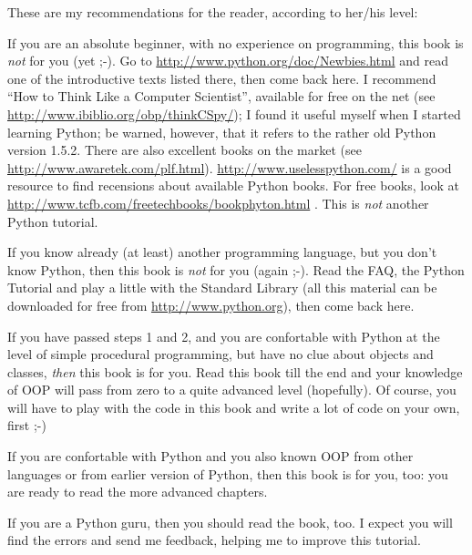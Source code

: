 \documentclass[10pt,english]{article}
\begin{document}
These are my recommendations for the reader, according to her/his level:
\begin{list}{.}
{
\setlength{\rightmargin}{\leftmargin}
}
\item {} 
If you are an absolute beginner, with no experience on programming,
this book is \emph{not} for you (yet ;-). Go to 
\href{http://www.python.org/doc/Newbies.html}{http://www.python.org/doc/Newbies.html} and read one of the introductive 
texts listed there, then come back here. I recommend ``How to Think Like 
a Computer Scientist'', available for free on the net (see 
\href{http://www.ibiblio.org/obp/thinkCSpy/}{http://www.ibiblio.org/obp/thinkCSpy/}); I found it useful myself when 
I started learning Python; be warned, however, that it refers to the rather 
old Python version 1.5.2. There are also excellent books 
on the market (see \href{http://www.awaretek.com/plf.html}{http://www.awaretek.com/plf.html}). 
\href{http://www.uselesspython.com/}{http://www.uselesspython.com/} is a good resource to find recensions 
about available Python books. For free books, look at
\href{http://www.tcfb.com/freetechbooks/bookphyton.html}{http://www.tcfb.com/freetechbooks/bookphyton.html} .
This is \emph{not} another Python tutorial.

\item {} 
If you know already (at least) another programming language, but you don't
know Python, then this book is \emph{not} for you (again ;-). Read the FAQ, the
Python Tutorial and play a little with the Standard Library (all this
material can be downloaded for free from  \href{http://www.python.org}{http://www.python.org}), then
come back here.

\item {} 
If you have passed steps 1 and 2, and you are confortable with Python
at the level of simple procedural programming, but have no clue about
objects and classes, \emph{then} this book is for you. Read this book till
the end and your knowledge of OOP will pass from zero to a quite advanced 
level (hopefully). Of course, you will have to play with the code in 
this book and write a lot of code on your own, first ;-)

\item {} 
If you are confortable with Python and you also known OOP from other
languages or from earlier version of Python, then this book is for
you, too: you are ready to read the more advanced chapters.

\item {} 
If you are a Python guru, then you should read the book, too. I expect
you will find the errors and send me feedback, helping me to improve
this tutorial.

\end{list}
\end{document}
